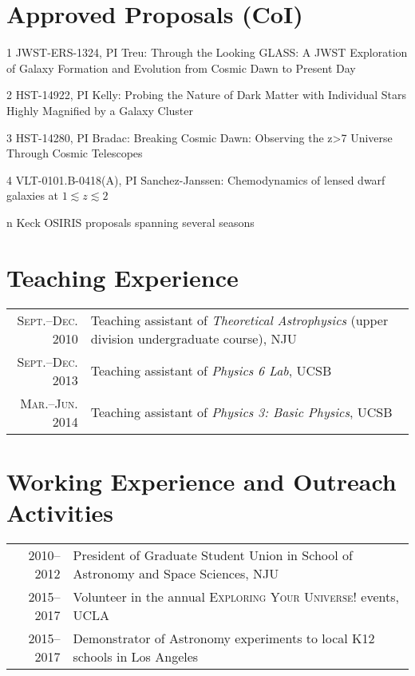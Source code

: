 \documentclass[letterpaper,10pt]{article}
\begin{document}
\section{Approved Proposals (CoI)}

\begin{list}{}{\leftmargin=0.5em}
    \item[1] JWST-ERS-1324, PI Treu: Through the Looking GLASS: A JWST Exploration of Galaxy Formation and Evolution from Cosmic Dawn to Present Day
    \item[2] HST-14922, PI Kelly: Probing the Nature of Dark Matter with Individual Stars Highly Magnified by a Galaxy Cluster
    \item[3] HST-14280, PI Bradac: Breaking Cosmic Dawn: Observing the z>7 Universe Through Cosmic Telescopes
    \item[4] VLT-0101.B-0418(A), PI Sanchez-Janssen: Chemodynamics of lensed dwarf galaxies at $1\lesssim z\lesssim 2$
    \item[n] Keck OSIRIS proposals spanning several seasons
\end{list}

\vspace{-.8em}
\section{Teaching Experience}
\begin{tabular}{rp{5.6in}}
\textsc{\small Sept.--Dec. 2010}  & Teaching assistant of \textit{Theoretical Astrophysics} (upper division undergraduate course), NJU \\
\textsc{\small Sept.--Dec. 2013}  & Teaching assistant of \textit{Physics 6 Lab}, UCSB   \\
\textsc{\small Mar.--Jun. 2014}  & Teaching assistant of \textit{Physics 3: Basic Physics}, UCSB
\end{tabular}

\vspace{-.8em}
\section{Working Experience and Outreach Activities}
\begin{tabular}{rp{5.6in}}
\textsc{2010--2012}  & President of Graduate Student Union in School of Astronomy and Space Sciences, NJU \\
\textsc{2015--2017}  & Volunteer in the annual \textsc{Exploring Your Universe!} events, UCLA \\
\textsc{2015--2017}  & Demonstrator of Astronomy experiments to local K12 schools in Los Angeles
\end{tabular}
\end{document}
